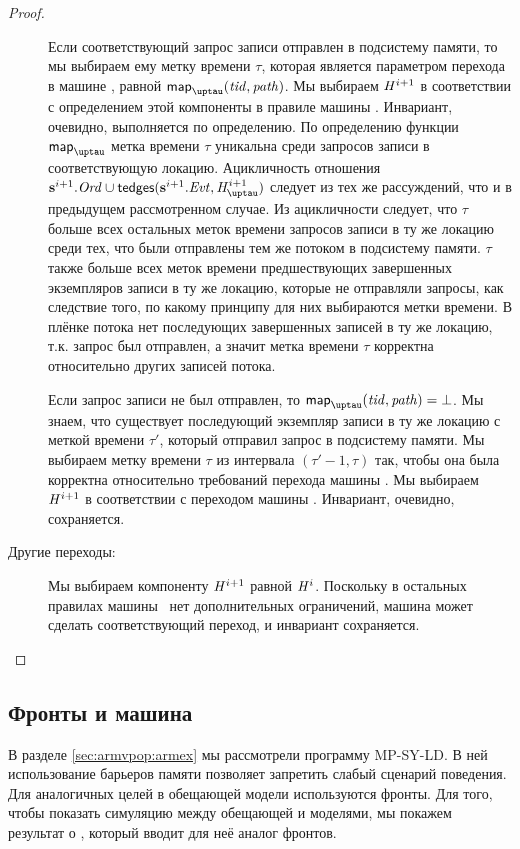 \begin{proof}
\begin{description}
    Если соответствующий запрос записи отправлен в подсистему памяти, то мы выбираем
    ему метку времени $\tau$, которая является параметром перехода в машине \ARMt,
    равной $\taumapping(\tId, \cpath)$.
    Мы выбираем $\mathit{H}^{i + 1}$ в соответствии с определением этой компоненты в
    правиле  машины \ARMt.
    Инвариант, очевидно, выполняется по определению.
    По определению функции $\taumapping$ метка времени $\tau$ уникальна среди запросов записи
    в соответствующую локацию.
    Ацикличность отношения $\s^{i+1}.\Ord \cup \moTau(\s^{i+1}.\Evt, \tmap^{i + 1})$
    следует из тех же рассуждений, что и в предыдущем рассмотренном случае.
    Из ацикличности следует, что $\tau$ больше всех остальных меток времени
    запросов записи в ту же локацию среди тех, что были отправлены тем же потоком
    в подсистему памяти.
    $\tau$ также больше всех меток времени предшествующих завершенных
    экземпляров записи в ту же локацию, которые не отправляли запросы,
    как следствие того, по какому принципу для них выбираются метки времени.
    В плёнке потока нет последующих завершенных записей в ту же локацию,
    т.к. запрос был отправлен, а значит метка времени $\tau$ корректна относительно
    других записей потока.
    
    Если запрос записи не был отправлен, то $\taumapping(\tId, \cpath) = \bot$.
    Мы знаем, что существует последующий экземпляр записи в ту же локацию с меткой
    времени $\tau'$, который отправил запрос в подсистему памяти.
    Мы выбираем метку времени $\tau$ из интервала $(\tau' - 1, \tau)$ так, чтобы
    она была корректна относительно требований перехода машины \ARMt.
    Мы выбираем $\mathit{H}^{i + 1}$ в соответствии с переходом
     машины \ARMt.
    Инвариант, очевидно, сохраняется.

  \item[Другие переходы:]
    Мы выбираем компоненту $\mathit{H}^{i + 1}$ равной $\mathit{H}^{i}$.
    Поскольку в остальных правилах машины \ARMt~нет дополнительных ограничений,
    машина может сделать соответствующий переход, и инвариант сохраняется.
    \qedhere
  \end{description}
\end{proof}

\subsection{Фронты и машина \ARMt}
В разделе \ref{sec:armvpop:armex} мы рассмотрели программу \textrm{MP-SY-LD}.
В ней использование барьеров памяти позволяет запретить слабый сценарий поведения.
Для аналогичных целей в обещающей модели используются фронты.
Для того, чтобы показать симуляцию между обещающей и \ARMt моделями,
мы покажем результат о \ARMt, который вводит для неё аналог фронтов.

